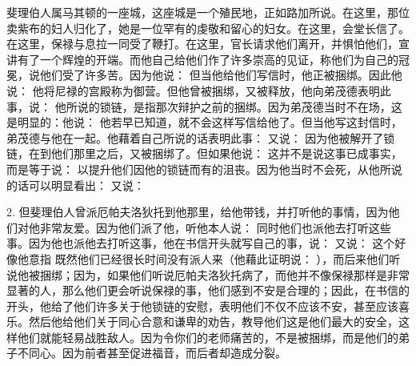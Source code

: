 斐理伯人属马其顿的一座城，这座城是一个殖民地，正如路加所说。在这里，那位卖紫布的妇人归化了，她是一位罕有的虔敬和留心的妇女。在这里，会堂长信了。在这里，保禄与息拉一同受了鞭打。在这里，官长请求他们离开，并惧怕他们，宣讲有了一个辉煌的开端。而他自己给他们作了许多崇高的见证，称他们为自己的冠冕，说他们受了许多苦。因为他说：  但当他给他们写信时，他正被捆绑。因此他说： 他将尼禄的宫殿称为御营。但他曾被捆绑，又被释放，他向弟茂德表明此事，说：  他所说的锁链，是指那次辩护之前的捆绑。因为弟茂德当时不在场，这是明显的：他说： 他若早已知道，就不会这样写信给他了。但当他写这封信时，弟茂德与他在一起。他藉着自己所说的话表明此事：  又说： 因为他被解开了锁链，在到他们那里之后，又被捆绑了。但如果他说： 这并不是说这事已成事实，而是等于说： 以提升他们因他的锁链而有的沮丧。因为他当时不会死，从他所说的话可以明显看出：  又说：\par

2. 但斐理伯人曾派厄帕夫洛狄托到他那里，给他带钱，并打听他的事情，因为他们对他非常友爱。因为他们派了他，听他本人说： 同时他们也派他去打听这些事。因为他也派他去打听这事，他在书信开头就写自己的事，说：  又说： 这个好像他意指 既然他们已经很长时间没有派人来（他藉此证明说： ），而后来他们听说他被捆绑；因为，如果他们听说厄帕夫洛狄托病了，而他并不像保禄那样是非常显著的人，那么他们更会听说保禄的事，他们感到不安是合理的；因此，在书信的开头，他给了他们许多关于他锁链的安慰，表明他们不仅不应该不安，甚至应该喜乐。然后他给他们关于同心合意和谦卑的劝告，教导他们这是他们最大的安全，这样他们就能轻易战胜敌人。因为令你们的老师痛苦的，不是被捆绑，而是他们的弟子不同心。因为前者甚至促进福音，而后者却造成分裂。\par

